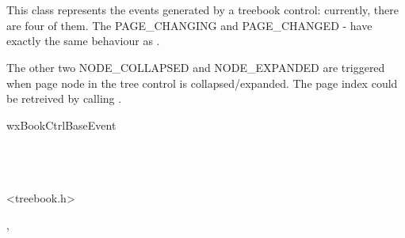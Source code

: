 
\section{}\label{wxtreebookevent}

This class represents the events generated by a treebook control: currently,
there are four of them. The PAGE\_CHANGING and PAGE\_CHANGED - have exactly the same
behaviour as .

The other two NODE\_COLLAPSED and NODE\_EXPANDED are triggered when page node in the tree control
is collapsed/expanded. The page index could be retreived by calling
.




wxBookCtrlBaseEvent\\
\\
\\
\\




<treebook.h>








, 





\label{wxtreebookeventwxtreebookevent}



